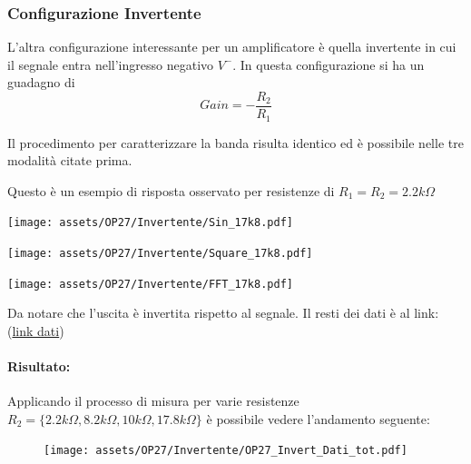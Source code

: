 \subsubsection{Configurazione Invertente}

L'altra configurazione interessante per un amplificatore è quella invertente in cui il segnale entra nell'ingresso negativo $V^-$.
 In questa configurazione si ha un guadagno di $$Gain = -\frac{R_2}{R_1}$$

 Il procedimento per caratterizzare la banda risulta identico ed è possibile nelle tre modalità citate prima.

 Questo è un esempio di risposta osservato per resistenze di $R_1 = R_2 = 2.2k\Omega$

\begin{minipage}{0.8\textwidth}

    \centering
    \begin{minipage}[b]{0.3\textwidth}
        \texttt{[image: assets/OP27/Invertente/Sin\_17k8.pdf]}
    \end{minipage}
    \hfill
    \begin{minipage}[b]{0.3\textwidth}
        \texttt{[image: assets/OP27/Invertente/Square\_17k8.pdf]}
    \end{minipage}
    \hfill
    \begin{minipage}[b]{0.3\textwidth}
        \texttt{[image: assets/OP27/Invertente/FFT\_17k8.pdf]}
    \end{minipage}
    \hfill    
\end{minipage}

Da notare che l'uscita è invertita rispetto al segnale. Il resti dei dati è al link: (\href{https://github.com/Yedi278/Esperimentazioni-Elettronica/tree/main/-\%20OPAMP/OP27/Invertente}{link dati})

\paragraph{Risultato:}
Applicando il processo di misura per varie resistenze $R_2 = \{ 2.2k\Omega, 8.2k\Omega, 10k\Omega, 17.8k\Omega \}$ è possibile vedere l'andamento seguente:

\begin{figure}[!h]
    \centering
    \texttt{[image: assets/OP27/Invertente/OP27\_Invert\_Dati\_tot.pdf]}
\end{figure}

